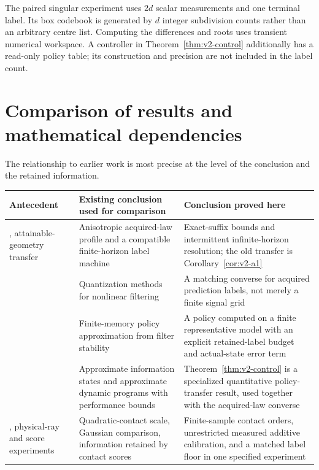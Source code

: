 The paired singular experiment uses $2d$ scalar measurements and one
terminal label. Its box codebook is generated by $d$ integer subdivision
counts rather than an arbitrary centre list. Computing the differences
and roots uses transient numerical workspace. A controller in
Theorem~\ref{thm:v2-control} additionally has a read-only policy table;
its construction and precision are not included in the label count.

\section{Comparison of results and mathematical dependencies}
\label{sec:v2-comparison}
The relationship to earlier work is most precise at the level of the
conclusion and the retained information.

\begin{center}\small
\begin{tabular}{p{}p{}p{}}
\toprule
Antecedent & Existing conclusion used for comparison & Conclusion proved here\\
\midrule
\cite{QiA1}, attainable-geometry transfer & Anisotropic acquired-law profile and a compatible finite-horizon label machine & Exact-suffix bounds and intermittent infinite-horizon resolution; the old transfer is Corollary~\ref{cor:v2-a1}\\[3pt]
\cite{PagesPham2005} & Quantization methods for nonlinear filtering & A matching converse for acquired prediction labels, not merely a finite signal grid\\[3pt]
\cite[Theorems 12, 16, 17]{KaraYuksel2022} & Finite-memory policy approximation from filter stability & A policy computed on a finite representative model with an explicit retained-label budget and actual-state error term\\[3pt]
\cite[Theorems 9, 27]{SSSM2022} & Approximate information states and approximate dynamic programs with performance bounds & Theorem~\ref{thm:v2-control} is a specialized quantitative policy-transfer result, used together with the acquired-law converse\\[3pt]
\cite{QiA2}, physical-ray and score experiments & Quadratic-contact scale, Gaussian comparison, information retained by contact scores & Finite-sample contact orders, unrestricted measured additive calibration, and a matched label floor in one specified experiment\\
\bottomrule
\end{tabular}
\end{center}

